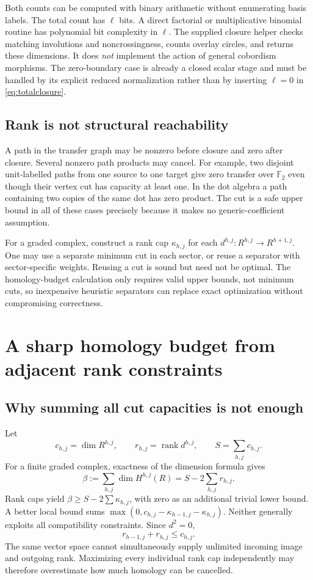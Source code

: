 \documentclass[11pt,letterpaper]{article}
\theoremstyle{definition}\newtheorem{definition}[theorem]{Definition}
\theoremstyle{remark}\newtheorem{remark}[theorem]{Remark}
\newcommand{\F}{\mathbb F_2}
\newcommand{\rk}{\operatorname{rank}}
\begin{document}
Both counts can be computed with binary arithmetic without enumerating
basis labels. The total count has $\ell$ bits. A direct factorial or
multiplicative binomial routine has polynomial bit complexity in $\ell$.
The supplied closure helper checks matching involutions and noncrossingness,
counts overlay circles, and returns these dimensions. It does \emph{not}
implement the action of general cobordism morphisms. The zero-boundary case
is already a closed scalar stage and must be handled by its explicit reduced
normalization rather than by inserting $\ell=0$ in \eqref{eq:totalclosure}.

\subsection{Rank is not structural reachability}
A path in the transfer graph may be nonzero before closure and zero after
closure. Several nonzero path products may cancel. For example, two disjoint
unit-labelled paths from one source to one target give zero transfer over
$\F$ even though their vertex cut has capacity at least one. In the dot
algebra a path containing two copies of the same dot has zero product.
The cut is a safe upper bound in all of these cases precisely because it
makes no generic-coefficient assumption.

For a graded complex, construct a rank cap $\kappa_{h,j}$ for each
$d^{h,j}:R^{h,j}\to R^{h+1,j}$. One may use a separate minimum cut in each
sector, or reuse a separator with sector-specific weights. Reusing a cut is
sound but need not be optimal. The homology-budget calculation only requires
valid upper bounds, not minimum cuts, so inexpensive heuristic separators
can replace exact optimization without compromising correctness.

\section{A sharp homology budget from adjacent rank constraints}
\subsection{Why summing all cut capacities is not enough}
Let
\[
c_{h,j}=\dim R^{h,j},\qquad r_{h,j}=\rk d^{h,j},\qquad
S=\sum_{h,j}c_{h,j}.
\]
For a finite graded complex, exactness of the dimension formula gives
\begin{equation}
\beta:=\sum_{h,j}\dim H^{h,j}(R)
 =S-2\sum_{h,j}r_{h,j}.
\label{eq:rankformula}
\end{equation}
Rank caps yield $\beta\geq S-2\sum\kappa_{h,j}$, with zero as an additional
trivial lower bound. A better local bound sums
$\max(0,c_{h,j}-\kappa_{h-1,j}-\kappa_{h,j})$. Neither generally exploits
all compatibility constraints. Since $d^2=0$,
\begin{equation}
 r_{h-1,j}+r_{h,j}\leq c_{h,j}.
\label{eq:adjacent}
\end{equation}
The same vector space cannot simultaneously supply unlimited incoming image
and outgoing rank. Maximizing every individual rank cap independently may
therefore overestimate how much homology can be cancelled.
\end{document}
